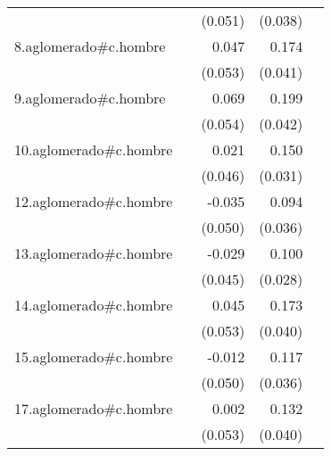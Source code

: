 {\begin{longtable}{l*{4}{D{.}{.}{-1}}}
            &                     &     (0.051)         &     (0.038)         &                     \\
\addlinespace
8.aglomerado#c.hombre&                     &       0.047         &       0.174\sym{***}&                     \\
            &                     &     (0.053)         &     (0.041)         &                     \\
\addlinespace
9.aglomerado#c.hombre&                     &       0.069         &       0.199\sym{***}&                     \\
            &                     &     (0.054)         &     (0.042)         &                     \\
\addlinespace
10.aglomerado#c.hombre&                     &       0.021         &       0.150\sym{***}&                     \\
            &                     &     (0.046)         &     (0.031)         &                     \\
\addlinespace
12.aglomerado#c.hombre&                     &      -0.035         &       0.094\sym{**} &                     \\
            &                     &     (0.050)         &     (0.036)         &                     \\
\addlinespace
13.aglomerado#c.hombre&                     &      -0.029         &       0.100\sym{***}&                     \\
            &                     &     (0.045)         &     (0.028)         &                     \\
\addlinespace
14.aglomerado#c.hombre&                     &       0.045         &       0.173\sym{***}&                     \\
            &                     &     (0.053)         &     (0.040)         &                     \\
\addlinespace
15.aglomerado#c.hombre&                     &      -0.012         &       0.117\sym{**} &                     \\
            &                     &     (0.050)         &     (0.036)         &                     \\
\addlinespace
17.aglomerado#c.hombre&                     &       0.002         &       0.132\sym{**} &                     \\
            &                     &     (0.053)         &     (0.040)         &                     \\

\end{longtable}}
